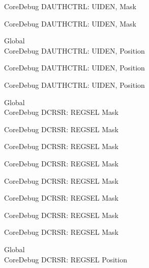 \begin{DoxyRefList}
\label{deprecated__deprecated000531}%
%
Core\+Debug DAUTHCTRL\+: UIDEN, Mask 

\label{deprecated__deprecated000633}%
%
Core\+Debug DAUTHCTRL\+: UIDEN, Mask  
\item[Global \doxylink{group___c_m_s_i_s___s_c_b_gab9cb997565a842f5eb9365bd58d7cda2}{Core\+Debug\+\_\+\+DAUTHCTRL\+\_\+\+UIDEN\+\_\+\+Pos} ]\hfill \\
\label{deprecated__deprecated000079}%
%
Core\+Debug DAUTHCTRL\+: UIDEN, Position 

\label{deprecated__deprecated000530}%
%
Core\+Debug DAUTHCTRL\+: UIDEN, Position 

\label{deprecated__deprecated000632}%
%
Core\+Debug DAUTHCTRL\+: UIDEN, Position  
\item[Global \doxylink{group___c_m_s_i_s___core_debug_ga17cafbd72b55030219ce5609baa7c01d}{Core\+Debug\+\_\+\+DCRSR\+\_\+\+REGSEL\+\_\+\+Msk} ]\hfill \\
\label{deprecated__deprecated000044}%
%
Core\+Debug DCRSR\+: REGSEL Mask 

\label{deprecated__deprecated000132}%
%
Core\+Debug DCRSR\+: REGSEL Mask 

\label{deprecated__deprecated000188}%
%
Core\+Debug DCRSR\+: REGSEL Mask 

\label{deprecated__deprecated000271}%
%
Core\+Debug DCRSR\+: REGSEL Mask 

\label{deprecated__deprecated000330}%
%
Core\+Debug DCRSR\+: REGSEL Mask 

\label{deprecated__deprecated000406}%
%
Core\+Debug DCRSR\+: REGSEL Mask 

\label{deprecated__deprecated000495}%
%
Core\+Debug DCRSR\+: REGSEL Mask 

\label{deprecated__deprecated000597}%
%
Core\+Debug DCRSR\+: REGSEL Mask  
\item[Global \doxylink{group___c_m_s_i_s___core_debug_ga52182c8a9f63a52470244c0bc2064f7b}{Core\+Debug\+\_\+\+DCRSR\+\_\+\+REGSEL\+\_\+\+Pos} ]\hfill \\
\label{deprecated__deprecated000043}%
%
Core\+Debug DCRSR\+: REGSEL Position 


\end{DoxyRefList}
